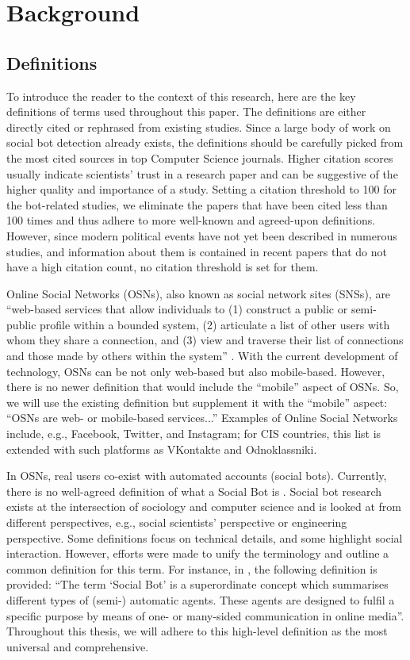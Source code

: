 \chapter{Background}
\label{ch:background}

\section{Definitions}
\label{sec:definitions}
To introduce the reader to the context of this research, here are the key definitions of terms used throughout this paper. The definitions are either directly cited or rephrased from existing studies. Since a large body of work on social bot detection already exists, the definitions should be carefully picked from the most cited sources in top Computer Science journals. Higher citation scores usually indicate scientists’ trust in a research paper and can be suggestive of the higher quality and importance of a study. Setting a citation threshold to 100 for the bot-related studies, we eliminate the papers that have been cited less than 100 times and thus adhere to more well-known and agreed-upon definitions. However, since modern political events have not yet been described in numerous studies, and information about them is contained in recent papers that do not have a high citation count, no citation threshold is set for them.

Online Social Networks (OSNs), also known as social network sites (SNSs), are ``web-based services that allow individuals to (1) construct a public or semi-public profile within a bounded system, (2) articulate a list of other users with whom they share a connection, and (3) view and traverse their list of connections and those made by others within the system'' \cite{Boyd2007}. With the current development of technology, OSNs can be not only web-based but also mobile-based. However, there is no newer definition that would include the ``mobile'' aspect of OSNs. So, we will use the existing definition but supplement it with the ``mobile'' aspect: ``OSNs are web- or mobile-based services...'' Examples of Online Social Networks include, e.g., Facebook, Twitter, and Instagram; for CIS countries, this list is extended with such platforms as VKontakte and Odnoklassniki.

In OSNs, real users co-exist with automated accounts (social bots). Currently, there is no well-agreed definition of what a Social Bot is \cite{Cresci2020}. Social bot research exists at the intersection of sociology and computer science and is looked at from different perspectives, e.g., social scientists’ perspective or engineering perspective. Some definitions focus on technical details, and some highlight social interaction. However, efforts were made to unify the terminology and outline a common definition for this term. For instance, in \cite{grimme2017social}, the following definition is provided: ``The term `Social Bot' is a superordinate concept which summarises different types of (semi-) automatic agents. These agents are designed to fulfil a specific purpose by means of one- or many-sided communication in online media''. Throughout this thesis, we will adhere to this high-level definition as the most universal and comprehensive.

